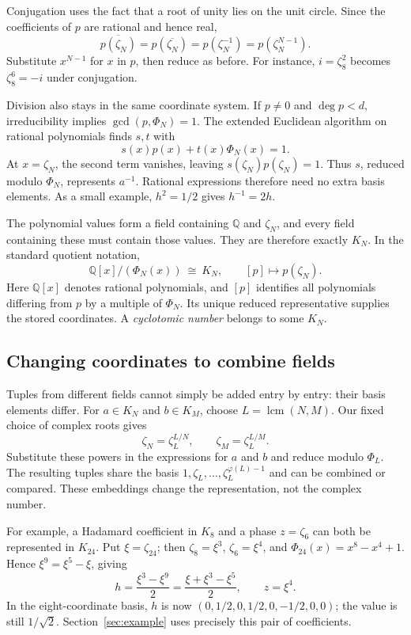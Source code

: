 \documentclass[11pt,a4paper]{article}
\newcommand{\Q}{\mathbb{Q}}
\DeclareMathOperator{\lcm}{lcm}
\begin{document}
Conjugation uses the fact that a root of unity lies on the unit circle.
Since the coefficients of $p$ are rational and hence real,
\[
\overline{p(\zeta_N)}
=p(\overline{\zeta_N})
=p(\zeta_N^{-1})
=p(\zeta_N^{N-1}).
\]
Substitute $x^{N-1}$ for $x$ in $p$, then reduce as before.
For instance, $i=\zeta_8^2$ becomes $\zeta_8^6=-i$ under conjugation.

Division also stays in the same coordinate system. If $p\ne0$ and
$\deg p<d$, irreducibility implies $\gcd(p,\Phi_N)=1$.
The extended Euclidean algorithm on rational polynomials finds $s,t$ with
\[
s(x)p(x)+t(x)\Phi_N(x)=1.
\]
At $x=\zeta_N$, the second term vanishes, leaving
$s(\zeta_N)p(\zeta_N)=1$. Thus $s$, reduced modulo $\Phi_N$, represents
$a^{-1}$. Rational expressions therefore need no extra basis elements.
As a small example, $h^2=1/2$ gives $h^{-1}=2h$.

The polynomial values form a field containing $\Q$ and $\zeta_N$, and
every field containing these must contain those values. They are
therefore exactly $K_N$. In the standard quotient notation,
\begin{equation}
\Q[x]/(\Phi_N(x))\ \cong\ K_N,\qquad
[p]\longmapsto p(\zeta_N).
\label{eq:field}
\end{equation}
Here $\Q[x]$ denotes rational polynomials, and $[p]$ identifies all
polynomials differing from $p$ by a multiple of $\Phi_N$.
Its unique reduced representative supplies the stored coordinates.
A \emph{cyclotomic number} belongs to some $K_N$.

\subsection{Changing coordinates to combine fields}
Tuples from different fields cannot simply be added entry by entry:
their basis elements differ. For $a\in K_N$ and $b\in K_M$, choose
$L=\lcm(N,M)$. Our fixed choice of complex roots gives
\[
\zeta_N=\zeta_L^{L/N},\qquad \zeta_M=\zeta_L^{L/M}.
\]
Substitute these powers in the expressions for $a$ and $b$ and reduce
modulo $\Phi_L$. The resulting tuples share the basis
$1,\zeta_L,\ldots,\zeta_L^{\varphi(L)-1}$ and can be combined or compared.
These embeddings change the representation, not the complex number.

For example, a Hadamard coefficient in $K_8$ and a phase
$z=\zeta_6$ can both be represented in $K_{24}$. Put $\xi=\zeta_{24}$;
then $\zeta_8=\xi^3$, $\zeta_6=\xi^4$, and
$\Phi_{24}(x)=x^8-x^4+1$. Hence $\xi^9=\xi^5-\xi$, giving
\[
h=\frac{\xi^3-\xi^9}{2}
 =\frac{\xi+\xi^3-\xi^5}{2},\qquad z=\xi^4.
\]
In the eight-coordinate basis, $h$ is now
$(0,1/2,0,1/2,0,-1/2,0,0)$; the value is still $1/\sqrt2$.
Section~\ref{sec:example} uses precisely this pair of coefficients.
\end{document}
